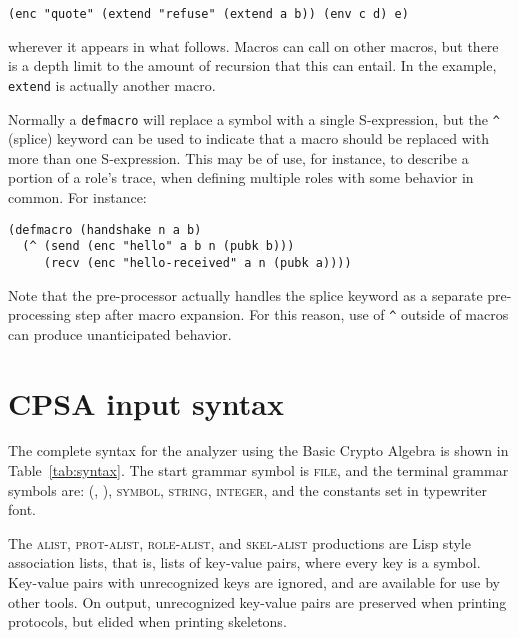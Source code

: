 \begin{verbatim}
(enc "quote" (extend "refuse" (extend a b)) (env c d) e)
\end{verbatim}

\noindent
wherever it appears in what follows.   Macros
can call on other macros, but there is a depth limit to the amount of
recursion that this can entail.  In the example, \texttt{extend} is
actually another macro.

 Normally a \texttt{defmacro} will
replace a symbol with a single S-expression, but the \texttt{\^}
(splice) keyword can be used to indicate that a macro should be
replaced with more than one S-expression.  This may be of use, for
instance, to describe a portion of a role's trace, when defining
multiple roles with some behavior in common.  For instance:

\begin{verbatim}
(defmacro (handshake n a b)
  (^ (send (enc "hello" a b n (pubk b)))
     (recv (enc "hello-received" a n (pubk a))))
\end{verbatim}

Note that the pre-processor actually handles the splice keyword as a
separate pre-processing step after macro expansion.  For this reason,
use of \texttt{\^} outside of macros can produce unanticipated behavior.

\section{CPSA input syntax}
\label{sec:input}

The complete syntax for the analyzer using the Basic Crypto Algebra is
shown in Table~\ref{tab:syntax}.  The start grammar symbol is
\textsc{file}, and the terminal grammar symbols are: \textsc{(, ),
  symbol, string, integer,} and the constants set in typewriter font.

The \textsc{alist}, \textsc{prot-alist}, \textsc{role-alist},
and \textsc{skel-alist} productions are Lisp style association lists,
that is, lists of key-value pairs, where every key is a symbol.
Key-value pairs with unrecognized keys are ignored, and are available
for use by other tools.  On output, unrecognized key-value pairs are
preserved when printing protocols, but elided when printing skeletons.

